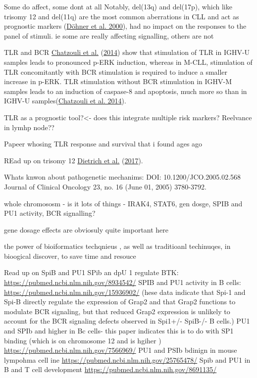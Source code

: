\documentclass[11pt, a4paper, twosided]{book}
\begin{document}
Some do affect, some dont at all
Notably, del(13q) and del(17p), which like trisomy 12 and del(11q) are the most common aberrations in CLL and act as prognostic markers (\protect\hyperlink{ref-Dohner2000}{Döhner et al. 2000}), had no impact on the responses to the panel of stimuli.
ie some are really affecting signalling, others are not

TLR and BCR
\protect\hyperlink{ref-Chatzouli2014}{Chatzouli et al.} (\protect\hyperlink{ref-Chatzouli2014}{2014}) show that stimulation of TLR in IGHV-U samples leads to pronounced p-ERK induction, whereas in M-CLL, stimulation of TLR concomitantly with BCR stimulation is required to induce a smaller increase in p-ERK. TLR stimulation without BCR stimulation in IGHV-M samples leads to an induction of caspase-8 and apoptosis, much more so than in IGHV-U samples(\protect\hyperlink{ref-Chatzouli2014}{Chatzouli et al. 2014}).

TLR as a prognostic tool?\textless- does this integrate multiple risk markers?
Reelvance in lymhp node??

Papeer whosing TLR response and survival that i found ages ago

REad up on trisomy 12
\protect\hyperlink{ref-JCIpaper}{Dietrich et al.} (\protect\hyperlink{ref-JCIpaper}{2017}).

Whats knwon about pathogenetic mechanims:
DOI: 10.1200/JCO.2005.02.568 Journal of Clinical Oncology 23, no. 16 (June 01, 2005) 3780-3792.

whole chromososm - is it lots of things - IRAK4, STAT6, gen dosge, SPIB and PU1 activity, BCR signalling?

gene dosage effects are obviosuly quite important here

the power of bioiformatics techqnieus , as well as traditioanl techinuqes, in bioogical discover, to save time and resouce

Read up on SpiB and PU1
SPib an dpU 1 regulate BTK: \url{https://pubmed.ncbi.nlm.nih.gov/8934542/}
SPIB and PU1 activity in B cells: \url{https://pubmed.ncbi.nlm.nih.gov/15936902/}
(hese data indicate that Spi-1 and Spi-B directly regulate the expression of Grap2 and that Grap2 functions to modulate BCR signaling, but that reduced Grap2 expression is unlikely to account for the BCR signaling defects observed in Spi1+/- SpiB-/- B cells.)
PU1 and SPIb and higher in Bc cells- this paper indicates this is to do with SP1 binding (which is on chromosome 12 and is hgiher ) \url{https://pubmed.ncbi.nlm.nih.gov/7566969/}
PU1 and PSIb bdinign in mouse lympohma cell ine \url{https://pubmed.ncbi.nlm.nih.gov/25765478/}
Spib and PU1 in B and T cell development \url{https://pubmed.ncbi.nlm.nih.gov/8691135/}
\end{document}
